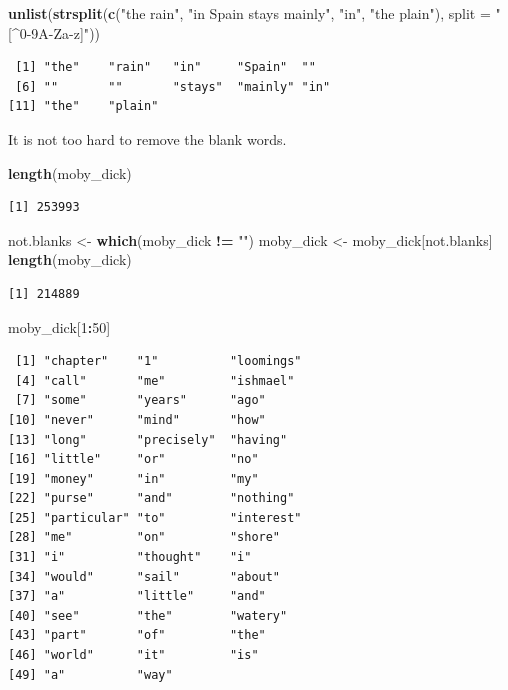 \documentclass[
]{krantz}
\makeatletter
\newenvironment{Shaded}{\begin{snugshade}}{\end{snugshade}}
\newcommand{\DataTypeTok}[1]{\textcolor[rgb]{0.27,0.27,0.27}{#1}}
\newcommand{\DecValTok}[1]{\textcolor[rgb]{0.06,0.06,0.06}{#1}}
\newcommand{\KeywordTok}[1]{\textcolor[rgb]{0.27,0.27,0.27}{\textbf{#1}}}
\newcommand{\NormalTok}[1]{#1}
\newcommand{\OperatorTok}[1]{\textcolor[rgb]{0.43,0.43,0.43}{\textbf{#1}}}
\newcommand{\StringTok}[1]{\textcolor[rgb]{0.5,0.5,0.5}{#1}}
\newenvironment{kframe}{%
\medskip{}
\setlength{\fboxsep}{.8em}
 \def\at@end@of@kframe{}%
 \ifinner\ifhmode%
  \def\at@end@of@kframe{\end{minipage}}%
  \begin{minipage}{\columnwidth}%
 \fi\fi%
 \def\FrameCommand##1{\hskip\@totalleftmargin \hskip-\fboxsep
 \colorbox{shadecolor}{##1}\hskip-\fboxsep
     \hskip-\linewidth \hskip-\@totalleftmargin \hskip\columnwidth}%
 \MakeFramed {\advance\hsize-\width
   \@totalleftmargin\z@ \linewidth\hsize
   \@setminipage}}%
 {\par\unskip\endMakeFramed%
 \at@end@of@kframe}
\renewenvironment{Shaded}{\begin{kframe}}{\end{kframe}}
\makeatother
\begin{document}
\begin{Shaded}
\begin{Highlighting}[]
\KeywordTok{unlist}\NormalTok{(}\KeywordTok{strsplit}\NormalTok{(}\KeywordTok{c}\NormalTok{(}\StringTok{"the rain"}\NormalTok{, }\StringTok{"in Spain    stays mainly"}\NormalTok{, }\StringTok{"in"}\NormalTok{, }\StringTok{"the plain"}\NormalTok{), }\DataTypeTok{split =} \StringTok{"[\^{}0{-}9A{-}Za{-}z]"}\NormalTok{))}
\end{Highlighting}
\end{Shaded}

\begin{verbatim}
 [1] "the"    "rain"   "in"     "Spain"  ""      
 [6] ""       ""       "stays"  "mainly" "in"    
[11] "the"    "plain" 
\end{verbatim}

It is not too hard to remove the blank words.

\begin{Shaded}
\begin{Highlighting}[]
\KeywordTok{length}\NormalTok{(moby\_dick)}
\end{Highlighting}
\end{Shaded}

\begin{verbatim}
[1] 253993
\end{verbatim}

\begin{Shaded}
\begin{Highlighting}[]
\NormalTok{not.blanks \textless{}{-}}\StringTok{ }\KeywordTok{which}\NormalTok{(moby\_dick }\OperatorTok{!=}\StringTok{ ""}\NormalTok{)}
\NormalTok{moby\_dick \textless{}{-}}\StringTok{ }\NormalTok{moby\_dick[not.blanks]}
\KeywordTok{length}\NormalTok{(moby\_dick)}
\end{Highlighting}
\end{Shaded}

\begin{verbatim}
[1] 214889
\end{verbatim}

\begin{Shaded}
\begin{Highlighting}[]
\NormalTok{moby\_dick[}\DecValTok{1}\OperatorTok{:}\DecValTok{50}\NormalTok{]}
\end{Highlighting}
\end{Shaded}

\begin{verbatim}
 [1] "chapter"    "1"          "loomings"  
 [4] "call"       "me"         "ishmael"   
 [7] "some"       "years"      "ago"       
[10] "never"      "mind"       "how"       
[13] "long"       "precisely"  "having"    
[16] "little"     "or"         "no"        
[19] "money"      "in"         "my"        
[22] "purse"      "and"        "nothing"   
[25] "particular" "to"         "interest"  
[28] "me"         "on"         "shore"     
[31] "i"          "thought"    "i"         
[34] "would"      "sail"       "about"     
[37] "a"          "little"     "and"       
[40] "see"        "the"        "watery"    
[43] "part"       "of"         "the"       
[46] "world"      "it"         "is"        
[49] "a"          "way"       
\end{verbatim}
\end{document}

